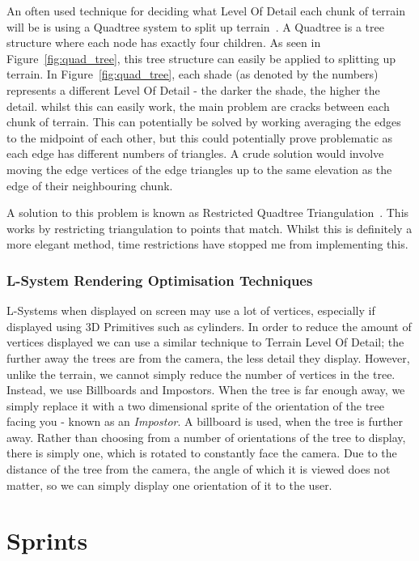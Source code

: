 \documentclass[a4paper,10pt]{report}
\begin{document}
An often used technique for deciding what Level Of Detail each chunk of terrain will be is using a Quadtree system to split up terrain~\cite{pajarola1998large}. A Quadtree is a tree structure where each node has exactly four children. As seen in Figure~\ref{fig:quad_tree}, this tree structure can easily be applied to splitting up terrain. In Figure~\ref{fig:quad_tree}, each shade (as denoted by the numbers) represents a different Level Of Detail - the darker the shade, the higher the detail. whilst this can easily work, the main problem are cracks between each chunk of terrain. This can potentially be solved by working averaging the edges to the midpoint of each other, but this could potentially prove problematic as each edge has different numbers of triangles. A crude solution would involve moving the edge vertices of the edge triangles up to the same elevation as the edge of their neighbouring chunk. \medskip

A solution to this problem is known as Restricted Quadtree Triangulation~\cite{pajarola1998large}. This works by restricting triangulation to points that match. Whilst this is definitely a more elegant method, time restrictions have stopped me from implementing this. 

\subsection{L-System Rendering Optimisation Techniques}
L-Systems when displayed on screen may use a lot of vertices, especially if displayed using 3D Primitives such as cylinders. In order to reduce the amount of vertices displayed we can use a similar technique to Terrain Level Of Detail; the further away the trees are from the camera, the less detail they display. However, unlike the terrain, we cannot simply reduce the number of vertices in the tree. Instead, we use Billboards and Impostors. When the tree is far enough away, we simply replace it with a two dimensional sprite of the orientation of the tree facing you - known as an \textit{Impostor}. A billboard is used, when the tree is further away. Rather than choosing from a number of orientations of the tree to display, there is simply one, which is rotated to constantly face the camera. Due to the distance of the tree from the camera, the angle of which it is viewed does not matter, so we can simply display one orientation of it to the user.


\chapter{Sprints}
\end{document}
